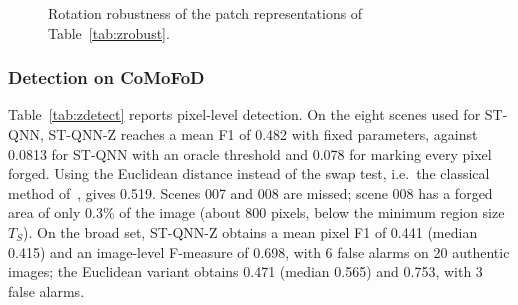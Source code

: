 \documentclass[conference]{IEEEtran}
\begin{document}
\begin{figure}[t]
\centering
{}
\caption{Rotation robustness of the patch representations of Table~\ref{tab:zrobust}.}
\label{fig:zrot}
\end{figure}

\subsubsection{Detection on CoMoFoD}
Table~\ref{tab:zdetect} reports pixel-level detection. On the eight scenes used for ST-QNN, ST-QNN-Z reaches a mean F1 of 0.482 with fixed parameters, against 0.0813 for ST-QNN with an oracle threshold and 0.078 for marking every pixel forged. Using the Euclidean distance instead of the swap test, i.e.\ the classical method of~\cite{cozzolino2015}, gives 0.519. Scenes 007 and 008 are missed; scene 008 has a forged area of only 0.3\% of the image (about 800 pixels, below the minimum region size $T_S$). On the broad set, ST-QNN-Z obtains a mean pixel F1 of 0.441 (median 0.415) and an image-level F-measure of 0.698, with 6 false alarms on 20 authentic images; the Euclidean variant obtains 0.471 (median 0.565) and 0.753, with 3 false alarms.
\end{document}
